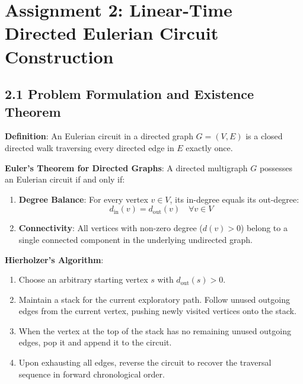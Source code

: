 \documentclass[12pt]{article}
\begin{document}
\newpage

\section*{Assignment 2: Linear-Time Directed Eulerian Circuit Construction}

\subsection*{2.1 Problem Formulation and Existence Theorem}
\textbf{Definition}: An Eulerian circuit in a directed graph $G = (V, E)$ is a closed directed walk traversing every directed edge in $E$ exactly once.

\textbf{Euler's Theorem for Directed Graphs}:
A directed multigraph $G$ possesses an Eulerian circuit if and only if:
\begin{enumerate}
    \item \textbf{Degree Balance}: For every vertex $v \in V$, its in-degree equals its out-degree:
    \[
    d_{\text{in}}(v) = d_{\text{out}}(v) \quad \forall v \in V
    \]
    \item \textbf{Connectivity}: All vertices with non-zero degree ($d(v) > 0$) belong to a single connected component in the underlying undirected graph.
\end{enumerate}

\textbf{Hierholzer's Algorithm}:
\begin{enumerate}
    \item Choose an arbitrary starting vertex $s$ with $d_{\text{out}}(s) > 0$.
    \item Maintain a stack for the current exploratory path. Follow unused outgoing edges from the current vertex, pushing newly visited vertices onto the stack.
    \item When the vertex at the top of the stack has no remaining unused outgoing edges, pop it and append it to the circuit.
    \item Upon exhausting all edges, reverse the circuit to recover the traversal sequence in forward chronological order.
\end{enumerate}
\end{document}
